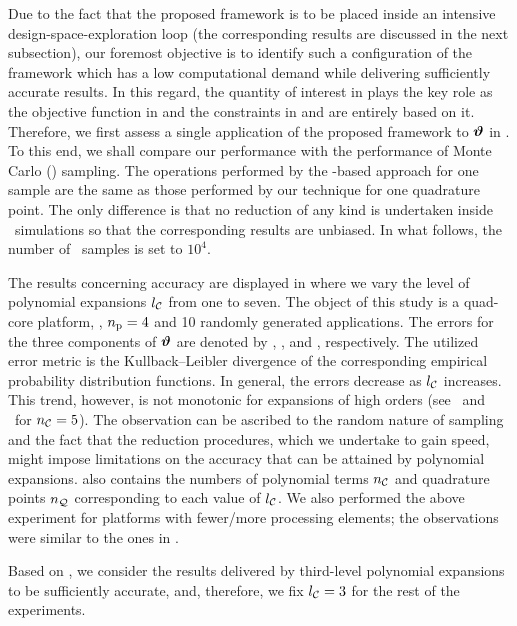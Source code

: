 Due to the fact that the proposed framework is to be placed inside an intensive design-space-exploration loop (the corresponding results are discussed in the next subsection), our foremost objective is to identify such a configuration of the framework which has a low computational demand while delivering sufficiently accurate results.
In this regard, the quantity of interest in  plays the key role as the objective function in  and the constraints in  and  are entirely based on it.
Therefore, we first assess a single application of the proposed framework to $\bm{\vartheta}$ in .
To this end, we shall compare our performance with the performance of Monte Carlo (\MC) sampling.
The operations performed by the \MC-based approach for one sample are the same as those performed by our technique for one quadrature point.
The only difference is that no reduction of any kind is undertaken inside \MC\ simulations so that the corresponding results are unbiased.
In what follows, the number of \MC\ samples is set to $10^4$.


The results concerning accuracy are displayed in  where we vary the level of polynomial expansions ${l_\mathcal{C}}$ from one to seven.
The object of this study is a quad-core platform, \ie, ${n_\text{p}} = 4$ and 10 randomly generated applications.
The errors for the three components of $\bm{\vartheta}$ are denoted by \errorE, \errorQ, and \errorT, respectively.
The utilized error metric is the Kullback--Leibler divergence of the corresponding empirical probability distribution functions.
In general, the errors decrease as ${l_\mathcal{C}}$ increases.
This trend, however, is not monotonic for expansions of high orders (see \errorQ\ and \errorT\ for ${n_\mathcal{C}} = 5$).
The observation can be ascribed to the random nature of sampling and the fact that the reduction procedures, which we undertake to gain speed, might impose limitations on the accuracy that can be attained by polynomial expansions.
 also contains the numbers of polynomial terms ${n_\mathcal{C}}$ and quadrature points ${n_\mathcal{Q}}$ corresponding to each value of ${l_\mathcal{C}}$.
We also performed the above experiment for platforms with fewer/more processing elements; the observations were similar to the ones in .

Based on , we consider the results delivered by third-level polynomial expansions to be sufficiently accurate, and, therefore, we fix ${l_\mathcal{C}} = 3$ for the rest of the experiments.

